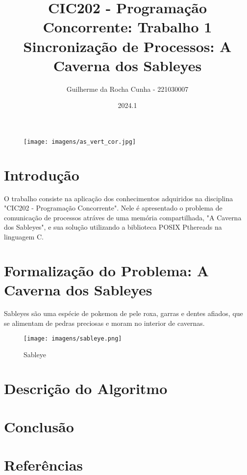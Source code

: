 \documentclass{article}
\title{CIC202 - Programação Concorrente: Trabalho 1 \\
        \large \textbf{Sincronização de Processos:} A Caverna dos Sableyes}
\author{Guilherme da Rocha Cunha - 221030007}
\date{2024.1}
\begin{document}
\pagestyle{fancy}

\maketitle

\begin{figure}[ht]
        \centering
        \texttt{[image: imagens/as\_vert\_cor.jpg]}
\end{figure}

\newpage

\fancyhead{}
\fancyfoot[C]{\thepage}


\renewcommand*\contentsname{Sumário}
\tableofcontents

\newpage

\section{Introdução}
O trabalho consiste na aplicação dos conhecimentos adquiridos na disciplina "CIC202 - Programação Concorrente". Nele é apresentado o problema de comunicação de processos atráves de uma memória compartilhada, "A Caverna dos Sableyes", e sua solução utilizando a biblioteca POSIX Pthereads na linguagem C.

\section{Formalização do Problema: A Caverna dos Sableyes}
Sableyes são uma espécie de pokemon de pele roxa, garras e dentes afiados, que se alimentam de pedras preciosas e moram no interior de cavernas.

\begin{figure}[ht]
        \centering
        \texttt{[image: imagens/sableye.png]}
        \caption{Sableye}
\end{figure}

\section{Descrição do Algoritmo}

\section{Conclusão}

\section{Referências}
\end{document}
